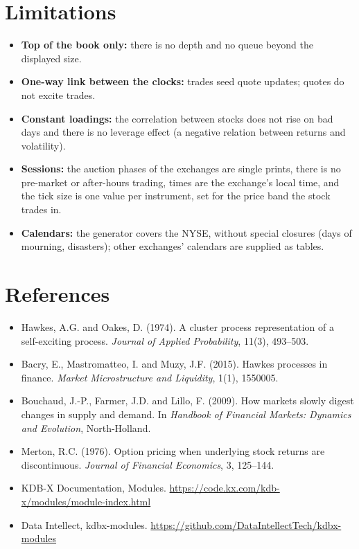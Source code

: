 \documentclass[11pt,a4paper]{article}
\theoremstyle{paper}
\begin{document}
\section{Limitations}

\begin{itemize}
\item \textbf{Top of the book only:} there is no depth and no queue beyond the displayed size.
\item \textbf{One-way link between the clocks:} trades seed quote updates; quotes do not excite trades.
\item \textbf{Constant loadings:} the correlation between stocks does not rise on bad days and there is no leverage effect (a negative relation between returns and volatility).
\item \textbf{Sessions:} the auction phases of the exchanges are single prints, there is no pre-market or after-hours trading, times are the exchange's local time, and the tick size is one value per instrument, set for the price band the stock trades in.
\item \textbf{Calendars:} the generator covers the NYSE, without special closures (days of mourning, disasters); other exchanges' calendars are supplied as tables.
\end{itemize}

\section{References}

\begin{itemize}
\item Hawkes, A.G. and Oakes, D. (1974). A cluster process representation of a self-exciting process. \emph{Journal of Applied Probability}, 11(3), 493--503.
\item Bacry, E., Mastromatteo, I. and Muzy, J.F. (2015). Hawkes processes in finance. \emph{Market Microstructure and Liquidity}, 1(1), 1550005.
\item Bouchaud, J.-P., Farmer, J.D. and Lillo, F. (2009). How markets slowly digest changes in supply and demand. In \emph{Handbook of Financial Markets: Dynamics and Evolution}, North-Holland.
\item Merton, R.C. (1976). Option pricing when underlying stock returns are discontinuous. \emph{Journal of Financial Economics}, 3, 125--144.
\item KDB-X Documentation, Modules. \url{https://code.kx.com/kdb-x/modules/module-index.html}
\item Data Intellect, kdbx-modules. \url{https://github.com/DataIntellectTech/kdbx-modules}
\end{itemize}
\end{document}

